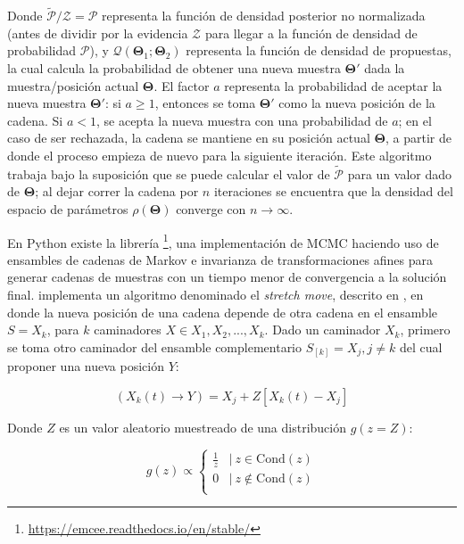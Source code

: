 Donde $\tilde{\mathcal{P}}/\mathcal{Z} = \mathcal{P}$ representa la función de
densidad posterior no normalizada (antes de dividir por la evidencia
$\mathcal{Z}$ para llegar a la función de densidad de probabilidad
$\mathcal{P}$), y $\mathcal{Q}(\mathbf{\Theta}_1 ; \mathbf{\Theta}_2)$
representa la función de densidad de propuestas, la cual calcula la probabilidad
de obtener una nueva muestra $\mathbf{\Theta}'$ dada la muestra/posición actual
$\mathbf{\Theta}$. El factor $a$ representa la probabilidad de aceptar la nueva
muestra $\mathbf{\Theta}'$: si $a \geq 1$, entonces se toma $\mathbf{\Theta}'$
como la nueva posición de la cadena. Si $a <1$, se acepta la nueva muestra con
una probabilidad de $a$; en el caso de ser rechazada, la cadena se mantiene en
su posición actual $\mathbf{\Theta}$, a partir de donde el proceso empieza de
nuevo para la siguiente iteración. Este algoritmo trabaja bajo la suposición que
se puede calcular el valor de $\tilde{\mathcal{P}}$ para un valor dado de
$\mathbf{\Theta}$; al dejar correr la cadena por $n$ iteraciones se encuentra
que la densidad del espacio de parámetros $\rho(\mathbf{\Theta})$ converge con
$n \rightarrow \infty$.

En Python existe la librería
\footnote{\url{https://emcee.readthedocs.io/en/stable/}}, una
implementación de MCMC haciendo uso de ensambles de cadenas de Markov e
invarianza de transformaciones afines para generar cadenas de muestras con un
tiempo menor de convergencia a la solución final.  implementa un
algoritmo denominado el \textit{stretch move}, descrito en
,
en donde la nueva posición de una cadena depende de otra cadena en el ensamble $S =
{X_k}$, para $k$ caminadores $X \in {X_1, X_2, ..., X_k}$. Dado un caminador
$X_k$, primero se toma otro caminador del ensamble complementario $S_{[k]} =
{X_j, j \neq k}$ del cual proponer una nueva posición $Y$:

\newpage

\begin{eqfloat}[!ht]
	\centering
	\begin{equation}
		(X_{k}(t) \rightarrow Y) = X_j + Z[X_{k}(t) - X_j]
	\end{equation}
\end{eqfloat}

Donde $Z$ es un valor aleatorio muestreado de una distribución $g(z = Z)$:

\begin{eqfloat}[!ht]
	\centering
	\begin{equation}
		g(z) \propto \left\{\begin{matrix}
			\frac{1}{z} & | \ z \in \mathrm{Cond}(z) \\
			0 &| \ z \notin \mathrm{Cond}(z) \\
			\end{matrix}\right.
	\end{equation}
\end{eqfloat}

